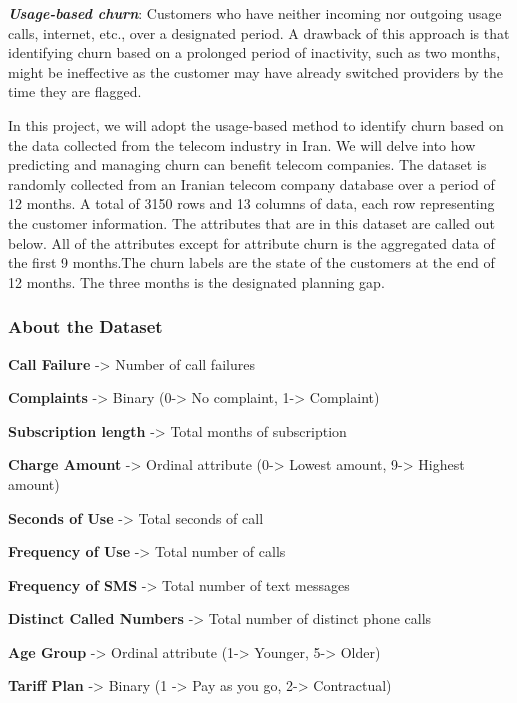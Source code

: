 \documentclass[11pt]{article}
\begin{document}
\textbf{\emph{Usage-based churn}}: Customers who have neither incoming
nor outgoing usage calls, internet, etc., over a designated period. A
drawback of this approach is that identifying churn based on a prolonged
period of inactivity, such as two months, might be ineffective as the
customer may have already switched providers by the time they are
flagged.

In this project, we will adopt the usage-based method to identify churn
based on the data collected from the telecom industry in Iran. We will
delve into how predicting and managing churn can benefit telecom
companies. The dataset is randomly collected from an Iranian telecom
company database over a period of 12 months. A total of 3150 rows and 13
columns of data, each row representing the customer information. The
attributes that are in this dataset are called out below. All of the
attributes except for attribute churn is the aggregated data of the
first 9 months.The churn labels are the state of the customers at the
end of 12 months. The three months is the designated planning gap.

    \subsubsection{About the Dataset}\label{about-the-dataset}

    \textbf{Call Failure} -\textgreater{} Number of call failures

\textbf{Complaints} -\textgreater{} Binary (0-\textgreater{} No
complaint, 1-\textgreater{} Complaint)

\textbf{Subscription length} -\textgreater{} Total months of
subscription

\textbf{Charge Amount} -\textgreater{} Ordinal attribute
(0-\textgreater{} Lowest amount, 9-\textgreater{} Highest amount)

\textbf{Seconds of Use} -\textgreater{} Total seconds of call

\textbf{Frequency of Use} -\textgreater{} Total number of calls

\textbf{Frequency of SMS} -\textgreater{} Total number of text messages

\textbf{Distinct Called Numbers} -\textgreater{} Total number of
distinct phone calls

\textbf{Age Group} -\textgreater{} Ordinal attribute (1-\textgreater{}
Younger, 5-\textgreater{} Older)

\textbf{Tariff Plan} -\textgreater{} Binary (1 -\textgreater{} Pay as
you go, 2-\textgreater{} Contractual)
\end{document}
